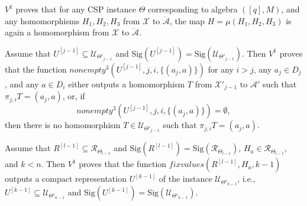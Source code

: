\documentclass[10pt,a4paper]{amsart}
\begin{document}
\begin{lem}\label{simplemm}
$V^1$ proves that for any CSP instance $\Theta$ corresponding to algebra $([q], M)$, and any homomorphisms $H_1, H_2, H_3$ from $\mathcal{X}$ to $\ddot{\mathcal{A}}$, the map $H = \mu(H_1, H_2, H_3)$ is again a homomorphism from $\mathcal{X}$ to $\ddot{\mathcal{A}}$.
\end{lem}

\begin{lem}\label{=a=-sify34gtth}
Assume that $U^{[j-1]} \subseteq \mathscr{U}_{\Theta'_{j-1}}$ and $\mathrm{Sig}(U^{[j-1]}) = \mathrm{Sig}(\mathscr{U}_{\Theta'_{j-1}})$. Then 
$V^1$ proves that the function $nonempty^3(U^{[j-1]}, j, i, \{(a_j, a)\})$ for any $i > j$, any $a_j \in D_j$, and any $a \in D_i$ either outputs a homomorphism $T$ from $\mathcal{X}'_{j-1}$ to $\ddot{\mathcal{A}}'$ such that $\pi_{j,i}T = (a_j, a)$, or, if
\[
nonempty^3(U^{[j-1]}, j, i, \{(a_j, a)\}) = \emptyset,
\]
then there is no homomorphism $T \in \mathscr{U}_{\Theta'_{j-1}}$ such that $\pi_{j,i}T = (a_j, a)$.
\end{lem}

\begin{lem}\label{alksjdca;syfrg}
Assume that $R^{[l-1]} \subseteq \mathscr{R}_{\Theta_{l-1}}$ and $\mathrm{Sig}(R^{[l-1]}) = \mathrm{Sig}(\mathscr{R}_{\Theta_{l-1}})$, $H_a\in \mathscr{R}_{\Theta_{l-1}}$, and $k < n$. Then $V^1$ proves that the function $fixvalues(R^{[l-1]}, H_a, k-1)$ outputs a compact representation $U^{[k-1]}$ of the instance $\mathscr{U}_{\Theta'_{k-1}}$, i.e., $U^{[k-1]} \subseteq \mathscr{U}_{\Theta'_{k-1}}$ and $\mathrm{Sig}(U^{[k-1]}) = \mathrm{Sig}(\mathscr{U}_{\Theta'_{k-1}})$.
\end{lem}
\end{document}
